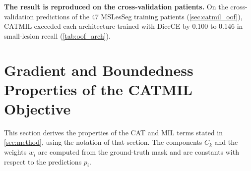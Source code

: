 \textbf{The result is reproduced on the cross-validation patients.} On
the cross-validation predictions of the 47 MSLesSeg training patients
(\cref{sec:catmil_oof}), CATMIL exceeded each architecture trained with
DiceCE by 0.100 to 0.146 in small-lesion recall
(\cref{tab:oof_arch}).

\begin{table}[t]
\centering
\caption{Paired differences between nnU-Net with CATMIL and four further
architectures trained with DiceCE on the cross-validation predictions of
the 81 MSLesSeg training scans (47 patients). Values and formatting as in
\cref{tab:oof_paired}.}
\label{tab:oof_arch}
\end{table}

\section{Gradient and Boundedness Properties of the CATMIL Objective}
\label{appendix:catmil-properties}

This section derives the properties of the CAT and MIL terms stated in
\cref{sec:method}, using the notation of that section. The components $C_k$
and the weights $w_i$ are computed from the ground-truth mask and are
constants with respect to the predictions $p_i$.

